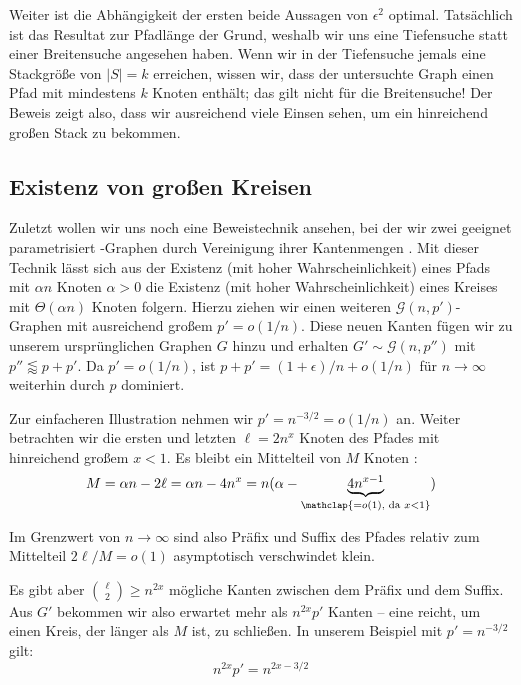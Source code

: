 Weiter ist die Abhängigkeit der ersten beide Aussagen von $\epsilon^2$ optimal.
Tatsächlich ist das Resultat zur Pfadlänge der Grund, weshalb wir uns eine Tiefensuche statt einer Breitensuche angesehen haben.
Wenn wir in der Tiefensuche jemals eine Stackgröße von $|S| = k$ erreichen, wissen wir, dass der untersuchte Graph einen Pfad mit mindestens $k$ Knoten enthält;
das gilt nicht für die Breitensuche!
Der Beweis zeigt also, dass wir ausreichend viele Einsen sehen, um ein hinreichend großen Stack zu bekommen.

\subsection{Existenz von großen Kreisen}
Zuletzt wollen wir uns noch eine Beweistechnik ansehen, bei der wir zwei geeignet parametrisiert \Gnp-Graphen durch Vereinigung ihrer Kantenmengen .
Mit dieser Technik lässt sich aus der Existenz (mit hoher Wahrscheinlichkeit) eines Pfads mit $\alpha n$ Knoten $\alpha > 0$ die Existenz (mit hoher Wahrscheinlichkeit) eines Kreises mit $\Theta(\alpha n)$ Knoten folgern.
Hierzu ziehen wir einen weiteren $\mathcal G(n, p')$-Graphen mit ausreichend großem $p' = o(1/n)$.
Diese neuen Kanten fügen wir zu unserem ursprünglichen Graphen $G$ hinzu und erhalten $G' \sim \mathcal G(n, p'')$ mit $p'' \lessapprox p + p'$.
Da $p' = o(1/n)$, ist $p + p' = (1+\epsilon)/n + o(1/n)$ für $n \to \infty$ weiterhin durch $p$ dominiert.

Zur einfacheren Illustration nehmen wir $p' = n^{-3/2} = o(1/n)$ an.
Weiter betrachten wir die ersten und letzten $\ell = 2 n^x$ Knoten des Pfades mit hinreichend großem $x < 1$.
Es bleibt ein Mittelteil von $M$ Knoten :
\begin{equation}
    M = \alpha n - 2\ell =\alpha n - 4 n^x =  n(\alpha - \underbrace{4n^{x - 1}}_{\mathclap{=o(1)\text{, da } x < 1}} )
\end{equation}

Im Grenzwert von $n\to\infty$ sind also Präfix und Suffix des Pfades relativ zum Mittelteil $2\ell / M = o(1)$ asymptotisch verschwindet klein.

Es gibt aber $\binom{\ell}{2} \ge n^{2x}$ mögliche Kanten zwischen dem Präfix und dem Suffix.
Aus $G'$ bekommen wir also erwartet mehr als $n^{2x} p'$ Kanten -- eine reicht, um einen Kreis, der länger als $M$ ist, zu schließen.
In unserem Beispiel mit $p' = n^{-3/2}$ gilt:
\begin{equation}
    n^{2x} p' = n^{2x - 3/2}
\end{equation}

